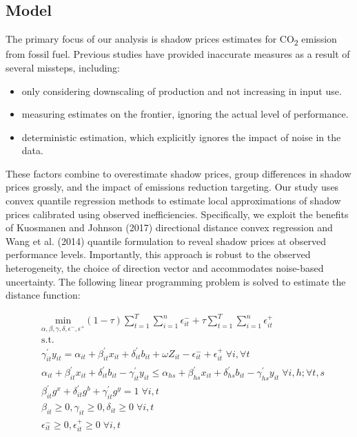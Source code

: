 \documentclass[
  10pt,
]{article}
\providecommand{\tightlist}{%
  \setlength{\itemsep}{0pt}\setlength{\parskip}{0pt}}
\begin{document}
\hypertarget{model}{%
\subsection{Model}\label{model}}

The primary focus of our analysis is shadow prices estimates for
CO\textsubscript{2} emission from fossil fuel. Previous studies have
provided inaccurate measures as a result of several missteps, including:

\begin{itemize}
\tightlist
\item
  only considering downscaling of production and not increasing in input
  use.
\item
  measuring estimates on the frontier, ignoring the actual level of
  performance.
\item
  deterministic estimation, which explicitly ignores the impact of noise
  in the data.
\end{itemize}

These factors combine to overestimate shadow prices, group differences
in shadow prices grossly, and the impact of emissions reduction
targeting. Our study uses convex quantile regression methods to estimate
local approximations of shadow prices calibrated using observed
inefficiencies. Specifically, we exploit the benefits of Kuosmanen and
Johnson (2017) directional distance convex regression and Wang et al.
(2014) quantile formulation to reveal shadow prices at observed
performance levels. Importantly, this approach is robust to the observed
heterogeneity, the choice of direction vector and accommodates
noise-based uncertainty. The following linear programming problem is
solved to estimate the distance function:

\begin{equation}
\begin{split}
& \underset{\alpha,\beta,\gamma,\delta,\epsilon^-,\epsilon^+}{\text{min}}
 (1-\tau) \sum^{T}_{t=1} \sum^{n}_{i=1}\epsilon^-_{it} + \tau \sum^{T}_{t=1}  \sum^{n}_{i=1}\epsilon^+_{it}  \\
&\text{s.t.} \\
&\gamma^{'}_{it}y_{it}=\alpha_{it}+\beta^{'}_{it}x_{it}+\delta^{'}_{it}b_{it} + \omega Z_{it} -\epsilon^-_{it}+\epsilon^+_{it} \; \forall i ,\forall t \\
&\alpha_{it}+\beta^{'}_{it}x_{it}+\delta^{'}_{it}b_{it}-\gamma^{'}_{it}y_{it} \leq \alpha_{hs}+\beta^{'}_{hs}x_{it}+\delta^{'}_{hs}b_{it}-\gamma^{'}_{hs}y_{it} \; \forall i,h ; \forall t,s \\
& \beta^{'}_{it}g^x+\delta^{'}_{it}g^b+\gamma^{'}_{it}g^y=1 \; \forall i,t\\
& \beta_{it} \geq0,\gamma_{it} \geq0,\delta_{it} \geq0 \; \forall i,t \\
& \epsilon^-_{it} \geq0, \epsilon^+_{it} \geq 0 \; \forall i,t
\end{split}
\end{equation}
\end{document}
